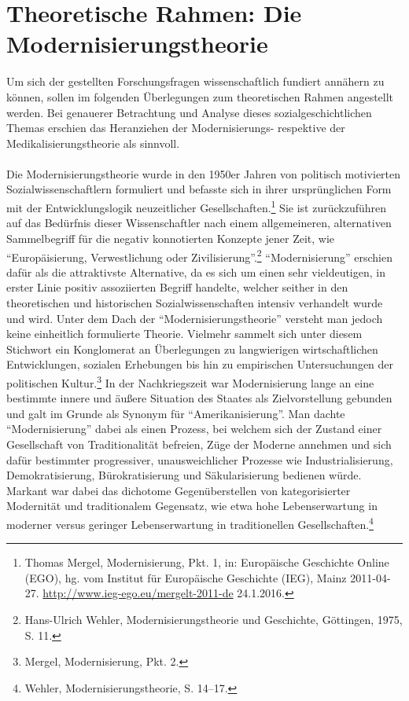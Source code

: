\documentclass[
    a4paper,
    12pt,
    hyphens,
    chapterprefix=true,
    headheight=33pt,
    footheight=29pt,
    headings=optiontohead,
]{scrartcl}
\begin{document}
\section{Theoretische Rahmen: Die Modernisierungstheorie}
Um sich der gestellten Forschungsfragen wissenschaftlich fundiert annähern zu können, sollen im folgenden Überlegungen zum theoretischen Rahmen angestellt werden. Bei genauerer Betrachtung und Analyse dieses sozialgeschichtlichen Themas erschien das Heranziehen der Modernisierungs- respektive der Medikalisierungstheorie als sinnvoll.\\
\\
Die Modernisierungstheorie wurde in den 1950er Jahren von politisch motivierten Sozialwissenschaftlern formuliert und befasste sich in ihrer ursprünglichen Form mit der Entwicklungslogik neuzeitlicher Gesellschaften.\footnote{Thomas Mergel, Modernisierung, Pkt. 1, in: Europäische Geschichte Online (EGO), hg. vom Institut für Europäische Geschichte (IEG), Mainz 2011-04-27. \url{http://www.ieg-ego.eu/mergelt-2011-de} 24.1.2016.} Sie ist zurückzuführen auf das Bedürfnis dieser Wissenschaftler nach einem allgemeineren, alternativen Sammelbegriff für die negativ konnotierten Konzepte jener Zeit, wie "`Europäisierung, Verwestlichung oder Zivilisierung"'.\footnote{Hans-Ulrich Wehler, Modernisierungstheorie und Geschichte, Göttingen, 1975, S. 11.} "`Modernisierung"' erschien dafür als die attraktivste Alternative, da es sich um einen sehr vieldeutigen, in erster Linie positiv assoziierten Begriff handelte, welcher seither in den theoretischen und historischen Sozialwissenschaften intensiv verhandelt wurde und wird. Unter dem Dach der "`Modernisierungstheorie"' versteht man jedoch keine einheitlich formulierte Theorie. Vielmehr sammelt sich unter diesem Stichwort ein Konglomerat an Überlegungen zu langwierigen wirtschaftlichen Entwicklungen, sozialen Erhebungen bis hin zu empirischen Untersuchungen der politischen Kultur.\footnote{Mergel, Modernisierung, Pkt. 2.} In der Nachkriegszeit war Modernisierung lange an eine bestimmte innere und äußere Situation des Staates als Zielvorstellung gebunden und galt im Grunde als Synonym für "`Amerikanisierung"'. Man dachte "`Modernisierung"' dabei als einen Prozess, bei welchem sich der Zustand einer Gesellschaft von Traditionalität befreien, Züge der Moderne annehmen und sich dafür bestimmter progressiver, unausweichlicher Prozesse wie Industrialisierung, Demokratisierung, Bürokratisierung und Säkularisierung bedienen würde. Markant war dabei das dichotome Gegenüberstellen von kategorisierter Modernität und traditionalem Gegensatz, wie etwa hohe Lebenserwartung in moderner versus geringer Lebenserwartung in traditionellen Gesellschaften.\footnote{Wehler, Modernisierungstheorie, S. 14--17.}\\
\end{document}
